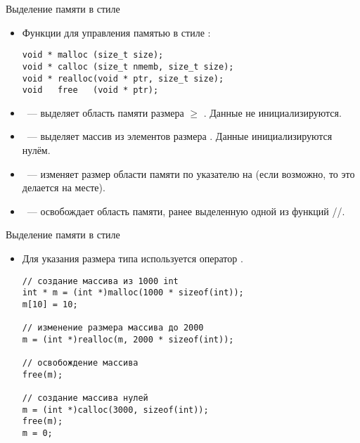 \documentclass{beamer}
\begin{document}
\begin{frame}[fragile]{Выделение памяти в стиле \langc}
    \begin{itemize}
        \item Функции для управления памятью в стиле \langc:
            {\small
\begin{lstlisting}
void * malloc (size_t size);
void * calloc (size_t nmemb, size_t size);
void * realloc(void * ptr, size_t size);
void   free   (void * ptr);               
\end{lstlisting}
}
        \item {}~--- выделяет область памяти размера $\ge$
            . Данные не инициализируются.

        \item {}~--- выделяет массив из  элементов  размера 
            . Данные инициализируются нулём.

        \item {}~--- изменяет размер области памяти по указателю
             на  (если возможно, то это делается на месте).

        \item {}~--- освобождает область памяти, ранее выделенную
            одной из функций //.
            
    \end{itemize}
\end{frame}

\begin{frame}[fragile]{Выделение памяти в стиле \langc}
    \begin{itemize}
        \item Для указания размера типа используется оператор .
\begin{lstlisting}
// создание массива из 1000 int    
int * m = (int *)malloc(1000 * sizeof(int));
m[10] = 10;

// изменение размера массива до 2000
m = (int *)realloc(m, 2000 * sizeof(int));

// освобождение массива
free(m);

// создание массива нулей
m = (int *)calloc(3000, sizeof(int));
free(m);
m = 0;
\end{lstlisting}
    \end{itemize}
\end{frame}
\end{document}
